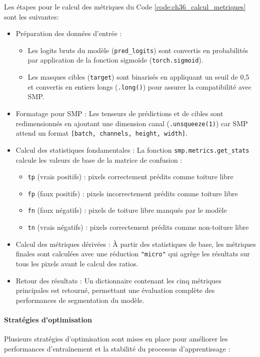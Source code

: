 Les étapes pour le calcul des métriques du Code \ref{code:ch36_calcul_metriques} sont les suivantes:
\begin{itemize}
    \item Préparation des données d'entrée :
    \begin{itemize}
        \item Les logits bruts du modèle (\texttt{pred\_logits}) sont convertis en probabilités par application de la fonction sigmoïde (\texttt{torch.sigmoid}).
        \item Les masques cibles (\texttt{target}) sont binarisés en appliquant un seuil de 0,5 et convertis en entiers longs (\texttt{.long()}) pour assurer la compatibilité avec SMP.
    \end{itemize}
    \item Formatage pour SMP : Les tenseurs de prédictions et de cibles sont redimensionnés en ajoutant une dimension canal (\texttt{.unsqueeze(1)}) car SMP attend un format \texttt{[batch, channels, height, width]}.
    \item Calcul des statistiques fondamentales : La fonction \texttt{smp.metrics.get\_stats} calcule les valeurs de base de la matrice de confusion :
    \begin{itemize}
        \item \texttt{tp} (vrais positifs) : pixels correctement prédits comme toiture libre
        \item \texttt{fp} (faux positifs) : pixels incorrectement prédits comme toiture libre
        \item \texttt{fn} (faux négatifs) : pixels de toiture libre manqués par le modèle
        \item \texttt{tn} (vrais négatifs) : pixels correctement prédits comme non-toiture libre
    \end{itemize}
    \item Calcul des métriques dérivées : À partir des statistiques de base, les métriques finales sont calculées avec une réduction \texttt{"micro"} qui agrège les résultats sur tous les pixels avant le calcul des ratios.
    \item Retour des résultats : Un dictionnaire contenant les cinq métriques principales est retourné, permettant une évaluation complète des performances de segmentation du modèle.
\end{itemize}

\paragraph{Stratégies d'optimisation}
Plusieurs stratégies d'optimisation sont mises en place pour améliorer les performances d'entraînement et la stabilité du processus d'apprentissage :

